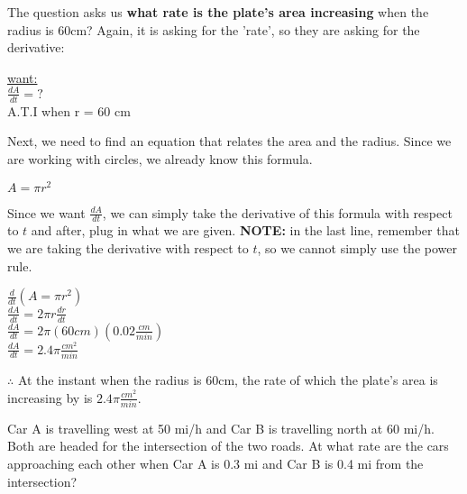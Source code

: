 \documentclass[12pt,fleqn]{book} %
\begin{document}
\pagebreak

\noindent The question asks us \textbf{what rate is the plate's area increasing} when the radius is 60cm? Again, it is asking for the 'rate', so they are asking
for the derivative:

\begin{center}
    \underline{want:} \\
    \vspace*{1mm}
    $\frac{dA}{dt}=?$ \\
    \vspace*{1mm}
    A.T.I when r = 60 cm
\end{center}

\noindent Next, we need to find an equation that relates the area and the radius. Since we are working with circles, we already know this formula.

\begin{center}
    $A=\pi r^2$
\end{center}

\noindent Since we want $\frac{dA}{dt}$, we can simply take the derivative of this formula with respect to $t$ and after, plug in what we are given. \textbf{NOTE:} in the last line, remember that
we are taking the derivative with respect to $t$, so we cannot simply use the power rule.

\begin{center}
    $\frac{d}{dt}(A=\pi r^2)$ \\
    \vspace*{1mm}
    $\frac{dA}{dt}=2 \pi r \frac{dr}{dt}$ \\
    \vspace*{1mm}
    $\frac{dA}{dt}=2 \pi (60cm)(0.02\frac{cm}{min})$ \\
    \vspace*{1mm}
    $\frac{dA}{dt}=2.4 \pi \frac{cm^2}{min}$ \\
\end{center}

\noindent $\therefore$ At the instant when the radius is 60cm, the rate of which the plate's area is increasing by is $2.4 \pi \frac{cm^2}{min}$.


\noindent\small{Car A is travelling west at 50 mi/h and Car B is travelling north at 60 mi/h. Both are headed for the intersection of the two roads. At what rate are
    the cars approaching each other when Car A is 0.3 mi and Car B is 0.4 mi from the intersection?}
\end{document}
